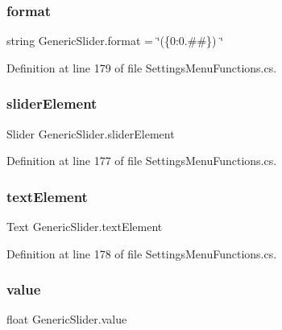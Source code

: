 \subsubsection{\texorpdfstring{format}{format}}
{\footnotesize\ttfamily string Generic\+Slider.\+format = \char`\"{}(\{0\+:0.\#\#\}) \char`\"{}\hspace{0.3cm}{\ttfamily [protected]}}



Definition at line 179 of file Settings\+Menu\+Functions.\+cs.

\mbox{\label{class_generic_slider_af8d3b973aab6f0228a47cf3bafac917c}} 
\subsubsection{\texorpdfstring{slider\+Element}{sliderElement}}
{\footnotesize\ttfamily Slider Generic\+Slider.\+slider\+Element\hspace{0.3cm}{\ttfamily [protected]}}



Definition at line 177 of file Settings\+Menu\+Functions.\+cs.

\mbox{\label{class_generic_slider_ad5ee1ef7b937d77e0ba8609382adec38}} 
\subsubsection{\texorpdfstring{text\+Element}{textElement}}
{\footnotesize\ttfamily Text Generic\+Slider.\+text\+Element\hspace{0.3cm}{\ttfamily [protected]}}



Definition at line 178 of file Settings\+Menu\+Functions.\+cs.

\mbox{\label{class_generic_slider_a1e04e9fdf361b51869427a95d475159e}} 
\subsubsection{\texorpdfstring{value}{value}}
{\footnotesize\ttfamily float Generic\+Slider.\+value\hspace{0.3cm}{\ttfamily [protected]}}



